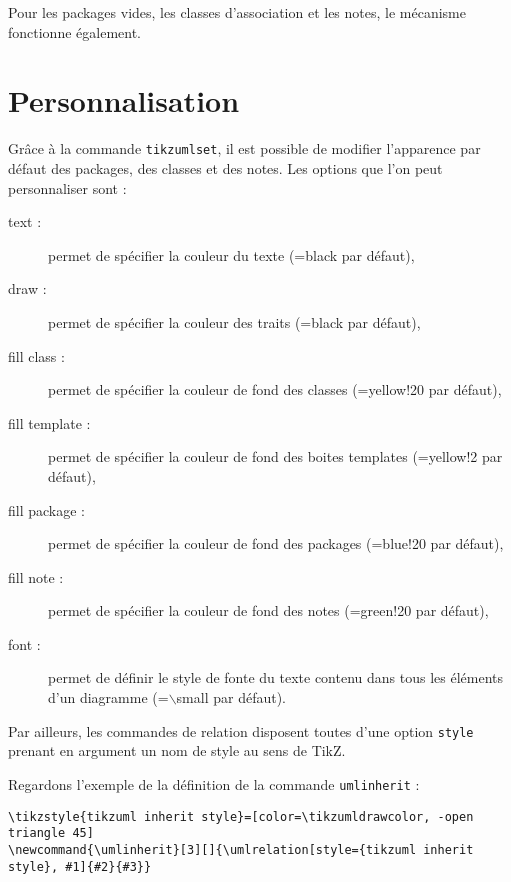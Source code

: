 \documentclass[a4paper,11pt]{report}
\newcommand{\inputTikZ}[1]{%
  }%
\newcommand{\inputTikZ}[1]{%
    \texttt{[image: fig/\#1.pdf]}%
  }%
\newcommand{\TikZ}{{\sc TikZ}}
\begin{document}
\medskip

\begin{minipage}{0.5\textwidth}

\end{minipage}
\begin{minipage}{0.5\textwidth}
\begin{center}
\inputTikZ{relativepos}
\end{center}
\end{minipage}

\medskip

Pour les packages vides, les classes d'association et les notes, le mécanisme fonctionne également.

\section{Personnalisation}\label{s.classset}

Grâce à la commande {\tt tikzumlset}, il est possible de modifier l'apparence par défaut des packages, des classes et des notes. Les options que l'on peut personnaliser sont :

\begin{description}
\item[text : ] permet de spécifier la couleur du texte (=black par défaut),
\item[draw :] permet de spécifier la couleur des traits (=black par défaut),
\item[fill class :] permet de spécifier la couleur de fond des classes (=yellow!20 par défaut),
\item[fill template :] permet de spécifier la couleur de fond des boites templates (=yellow!2 par défaut),
\item[fill package :] permet de spécifier la couleur de fond des packages (=blue!20 par défaut),
\item[fill note :] permet de spécifier la couleur de fond des notes (=green!20 par défaut),
\item[font :] permet de définir le style de fonte du texte contenu dans tous les éléments d'un diagramme (=$\backslash$small par défaut).
\end{description}

Par ailleurs, les commandes de relation disposent toutes d'une option {\tt style} prenant en argument un nom de style au sens de \TikZ.

Regardons l'exemple de la définition de la commande {\tt umlinherit} :

\begin{lstlisting}
\tikzstyle{tikzuml inherit style}=[color=\tikzumldrawcolor, -open triangle 45]
\newcommand{\umlinherit}[3][]{\umlrelation[style={tikzuml inherit style}, #1]{#2}{#3}}
\end{lstlisting}
\end{document}
